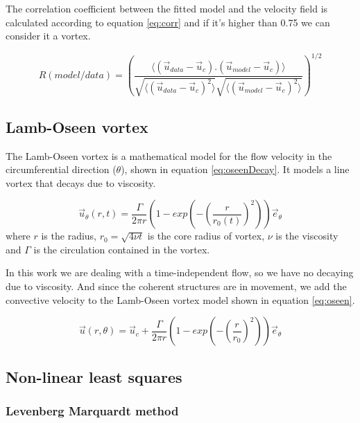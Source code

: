 \documentclass[12pt, a4paper, openany]{memoir}
\begin{document}
The correlation coefficient between the fitted model and the velocity field is calculated according to equation \ref{eq:corr} and if it's higher than 0.75 we can consider it a vortex.

\begin{equation}
\label{eq:corr}
R(model/data) = \left( \frac{\langle (\vec{u}_{data}-\vec{u}_c).(\vec{u}_{model}-\vec{u}_c)\rangle }
{\sqrt{\langle (\vec{u}_{data}-\vec{u}_c)^2\rangle} \sqrt{\langle (\vec{u}_{model}-\vec{u}_c)^2\rangle}} \right)^{1/2}
\end{equation}

\subsection{Lamb-Oseen vortex}

The Lamb-Oseen vortex is a mathematical model for the flow velocity in the circumferential direction ($\theta$), shown in equation \ref{eq:oseenDecay}. It models a line vortex that decays due to viscosity.

\begin{equation}
\label{eq:oseenDecay}
\vec{u}_\theta(r,t) = \frac{\Gamma}{2\pi r} \left( 1 - exp \left( -\left(\frac{r}{r_0(t)}\right)^2\right)\right) \vec{e}_{\theta}
\end{equation}
where $r$ is the radius, $r_0 = \sqrt{4 \nu t}$ is the core radius of vortex, $\nu$ is the viscosity and $\Gamma$ is the circulation contained in the vortex. 

In this work we are dealing with a time-independent flow, so we have no decaying due to viscosity. And since the coherent structures are in movement, we add the convective velocity to the Lamb-Oseen vortex model shown in equation \ref{eq:oseen}.  

\begin{equation}
\label{eq:oseen}
\vec{u}(r,\theta) = \vec{u}_c + \frac{\Gamma}{2\pi r} \left( 1 - exp \left( -\left(\frac{r}{r_0}\right)^2\right)\right) \vec{e}_{\theta}
\end{equation}

\subsection{Non-linear least squares}

\subsubsection{Levenberg Marquardt method}
\end{document}
